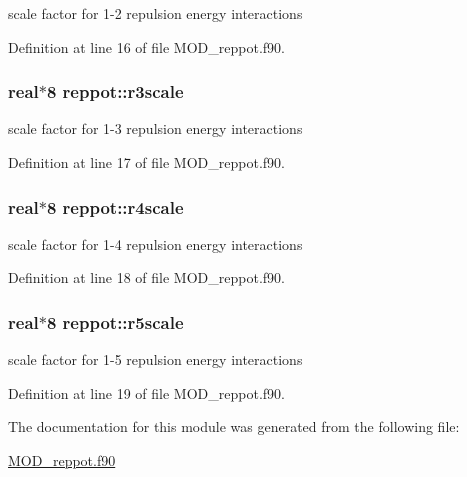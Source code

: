 scale factor for 1-\/2 repulsion energy interactions 



Definition at line 16 of file M\-O\-D\-\_\-reppot.\-f90.

\hypertarget{classreppot_a5fca055a7735dcb67f6d449c8056c6f3}{
\subsubsection[{r3scale}]{\setlength{\rightskip}{0pt plus 5cm}real$\ast$8 reppot\-::r3scale}}\label{classreppot_a5fca055a7735dcb67f6d449c8056c6f3}


scale factor for 1-\/3 repulsion energy interactions 



Definition at line 17 of file M\-O\-D\-\_\-reppot.\-f90.

\hypertarget{classreppot_ac73340b6405f1d4bf3ee911abbdb5107}{
\subsubsection[{r4scale}]{\setlength{\rightskip}{0pt plus 5cm}real$\ast$8 reppot\-::r4scale}}\label{classreppot_ac73340b6405f1d4bf3ee911abbdb5107}


scale factor for 1-\/4 repulsion energy interactions 



Definition at line 18 of file M\-O\-D\-\_\-reppot.\-f90.

\hypertarget{classreppot_adb1ef8869c6e4eb54049f0a1263d16a3}{
\subsubsection[{r5scale}]{\setlength{\rightskip}{0pt plus 5cm}real$\ast$8 reppot\-::r5scale}}\label{classreppot_adb1ef8869c6e4eb54049f0a1263d16a3}


scale factor for 1-\/5 repulsion energy interactions 



Definition at line 19 of file M\-O\-D\-\_\-reppot.\-f90.



The documentation for this module was generated from the following file\-:\begin{DoxyCompactItemize}
\item 
\hyperlink{MOD__reppot_8f90}{M\-O\-D\-\_\-reppot.\-f90}\end{DoxyCompactItemize}
